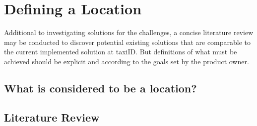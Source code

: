 
\chapter{Defining a Location}

\ifpdf
  \graphicspath{{Chapter2/Figs/Raster/}{Chapter2/Figs/PDF/}{Chapter2/Figs/}}
\else
  \graphicspath{{Chapter2/Figs/Vector/}{Chapter2/Figs/}}
\fi

Additional to investigating solutions for the challenges, a concise literature review may be conducted to discover potential existing solutions that are comparable to the current implemented solution at taxiID. But definitions of what must be achieved should be explicit and according to the goals set by the product owner.

\section{What is considered to be a location?}



\section{Literature Review}
